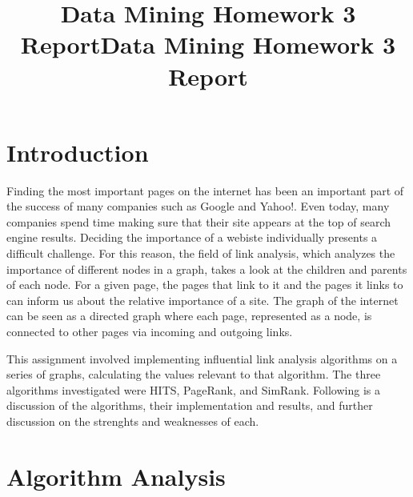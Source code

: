 \documentclass[
  paper=a4,
,captions=tableheading
]{scrartcl}
\title{Data Mining Homework 3 Report}
\date{}
\title{Data Mining Homework 3 Report}
\author{}
\begin{document}
\begin{titlepage}
\newcommand{\colorRule}[3][black]{\textcolor[HTML]{#1}{\rule{#2}{#3}}}
\end{titlepage}
\restoregeometry




\hypertarget{introduction}{%
\section{Introduction}\label{introduction}}

Finding the most important pages on the internet has been an important
part of the success of many companies such as Google and Yahoo!. Even
today, many companies spend time making sure that their site appears at
the top of search engine results. Deciding the importance of a webiste
individually presents a difficult challenge. For this reason, the field
of link analysis, which analyzes the importance of different nodes in a
graph, takes a look at the children and parents of each node. For a
given page, the pages that link to it and the pages it links to can
inform us about the relative importance of a site. The graph of the
internet can be seen as a directed graph where each page, represented as
a node, is connected to other pages via incoming and outgoing links.

This assignment involved implementing influential link analysis
algorithms on a series of graphs, calculating the values relevant to
that algorithm. The three algorithms investigated were HITS, PageRank,
and SimRank. Following is a discussion of the algorithms, their
implementation and results, and further discussion on the strenghts and
weaknesses of each.

\hypertarget{algorithm-analysis}{%
\section{Algorithm Analysis}\label{algorithm-analysis}}
\end{document}
